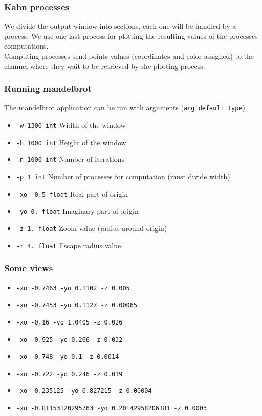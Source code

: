 \documentclass[10pt,a4paper]{article}
\begin{document}
\subsubsection{Kahn processes}
We divide the output window into sections, each one will be handled by a process. We use one last process for plotting the resulting values of the processes computations.\\
Computing processes send points values (coordinates and color assigned) to the channel where they wait to be retrieved by the plotting process.

\subsubsection{Running mandelbrot}
The mandelbrot application can be ran with arguments (\texttt{arg default type})
\begin{itemize}[label={}]
\item \texttt{-w 1300 int} Width of the window
\item \texttt{-h 1000 int} Height of the window
\item \texttt{-n 1000 int} Number of iterations
\item \texttt{-p 1 int} Number of processes for computation (must divide width)
\item \texttt{-xo -0.5 float} Real part of origin
\item \texttt{-yo 0. float} Imaginary part of origin
\item \texttt{-z 1. float} Zoom value (radius around origin)
\item \texttt{-r 4. float} Escape radius value

\end{itemize}

\subsubsection{Some views}
\begin{itemize}[label={}]
\item \texttt{-xo -0.7463 -yo 0.1102 -z 0.005}
\item \texttt{-xo -0.7453 -yo 0.1127 -z 0.00065}
\item \texttt{-xo -0.16 -yo 1.0405 -z 0.026}
\item \texttt{-xo -0.925 -yo 0.266 -z 0.032}
\item \texttt{-xo -0.748 -yo 0.1 -z 0.0014}
\item \texttt{-xo -0.722 -yo 0.246 -z 0.019}
\item \texttt{-xo -0.235125 -yo 0.827215 -z 0.00004}
\item \texttt{-xo -0.81153120295763 -yo 0.20142958206181 -z 0.0003}
\end{itemize}
\end{document}
